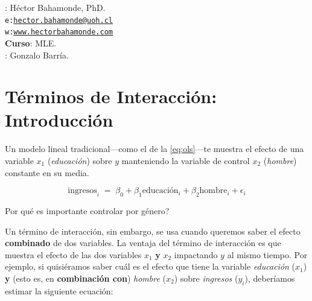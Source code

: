 \documentclass[onesided]{article}\usepackage[]{graphicx}\usepackage[]{color}
\begin{document}











\hspace{-5mm}{\bf Profesor}: H\'ector Bahamonde, PhD.\\
\texttt{e:}\href{mailto:hector.bahamonde@uoh.cl}{\texttt{hector.bahamonde@uoh.cl}}\\
\texttt{w:}\href{http://www.hectorbahamonde.com}{\texttt{www.hectorbahamonde.com}}\\
{\bf Curso}: MLE.\\
\hspace{-5mm}{\bf TA}: Gonzalo Barr\'ia.


\section*{T\'erminos de Interacci\'on: Introducci\'on}

Un modelo lineal tradicional---como el de la \autoref{eq:ols}---te muestra el efecto de una variable $x_{1}$ (\emph{educaci\'on}) sobre $y$ manteniendo la variable de control $x_{2}$ (\emph{hombre}) constante en su media. 

    \begin{equation}\label{eq:ols}
      \text{ingresos}_{i} \;=\; \beta_{0} + \beta_{1}\text{educaci\'on}_{i} + \beta_{2}\text{hombre}_{i} + \epsilon_{i}
    \end{equation}

{\color{red}Por qu\'e es importante controlar por g\'enero?}    

Un t\'ermino de interacci\'on, sin embargo, se usa cuando queremos saber el efecto {\bf combinado} de dos variables. La ventaja del t\'ermino de interacci\'on es que muestra el efecto de las dos variables  $x_{1}$ {\bf y}  $x_{2}$ impactando $y$ al mismo tiempo. Por ejemplo, si quisi\'eramos saber cu\'al es el efecto que tiene la variable \emph{educaci\'on} ($x_{1}$) {\bf y} (esto es, en {\bf combinaci\'on con}) \emph{hombre} ($x_{2}$) sobre \emph{ingresos} ($y_{i}$), deber\'iamos estimar la siguiente ecuaci\'on:
\end{document}
